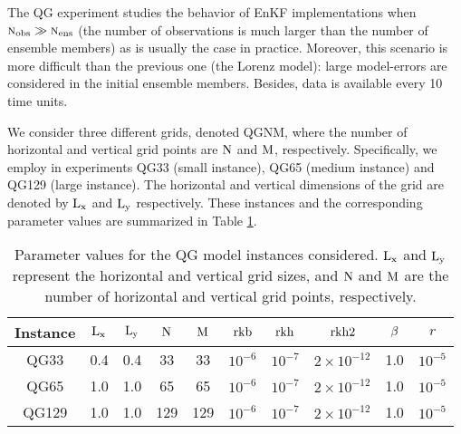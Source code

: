 \documentclass[12pt]{article}
\newcommand{\Nobs}{\textsc{n}_{{\rm obs}}}
\newcommand{\Nens}{\textsc{n}_{{\rm ens}}}
\begin{document}
The QG experiment studies the behavior of EnKF implementations when $\Nobs \gg \Nens$ (the number of observations is much larger than the number of ensemble members) as is usually the case in practice. Moreover, this scenario is more difficult than the previous one (the Lorenz model): large model-errors are considered in the initial ensemble members. Besides, data is available every 10 time units. 

We consider three different grids, denoted QGNM, where the number of horizontal and vertical grid points are $ \rm N$ and $\rm M$, respectively. Specifically, we employ in experiments QG33 (small instance),  QG65 (medium instance) and QG129 (large instance). The horizontal and vertical dimensions of the grid are denoted by $\rm L_x$ and $\rm L_y$ respectively.  These instances and the corresponding parameter values are summarized in Table  \ref{Tab:QG-Instances}.
\begin{table}[H]
\centering
{ \footnotesize
\begin{tabular}{|c|c|c|c|c|c|c|c|c|c|} \hline
Instance & ${\rm L_x}$ & ${\rm L_y}$ & ${\rm N}$ & ${\rm M}$ & ${\rm rkb}$ & ${\rm rkh}$ & ${\rm rkh2}$ & ${\rm \beta}$ & $r$ \\ \hline
QG33 & 0.4 & 0.4 & 33 & 33 & $10^{-6}$ & $10^{-7}$ & $2 \times 10^{-12}$ & 1.0 & $10^{-5}$ \\ \hline
QG65 & 1.0 & 1.0 & 65 & 65 & $10^{-6}$ & $10^{-7}$ & $2 \times 10^{-12}$ & 1.0 & $10^{-5}$  \\ \hline
QG129 & 1.0 & 1.0 & 129 & 129 & $10^{-6}$ & $10^{-7}$ & $2 \times 10^{-12}$ & 1.0 & $10^{-5}$  \\ \hline
\end{tabular}
}
\caption{Parameter values for the QG model instances considered. $\rm L_x$ and $\rm L_y$ represent the horizontal and vertical grid sizes, and $\rm N$ and $\rm M$ are the number of horizontal and vertical grid points, respectively.}
\label{Tab:QG-Instances}
\end{table}
\end{document}
